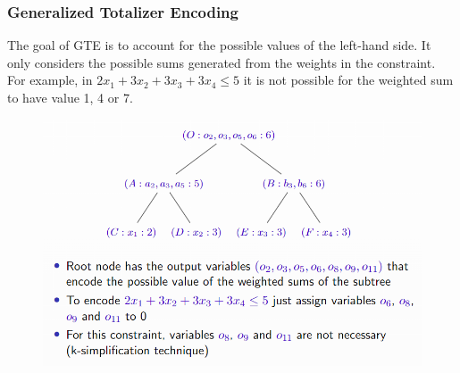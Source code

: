 \documentclass[10pt,a4paper]{report}
\begin{document}
\subsubsection{Generalized Totalizer Encoding}
The goal of GTE  is to account for the possible values of the left-hand side. It only considers the possible sums generated from the weights in the constraint. For example, in $2x_1 + 3x_2 + 3x_3 + 3x_4 \leq 5$ it is not possible for the weighted sum to have value 1, 4 or 7.
\begin{figure}[H]
    \centering
    \includegraphics[scale=0.5]{20.png}
\end{figure}
\end{document}
